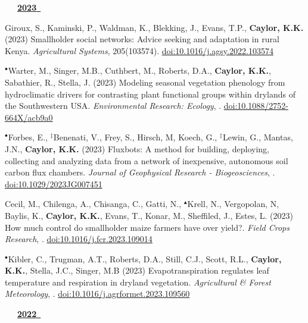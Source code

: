 
                                                                                            

\mbox{\ \ \ \underline{\textbf{2023 }}}

\begin{etaremune}

\item Giroux, S., Kaminski, P., Waldman, K., Blekking, J., Evans, T.P., \textbf{ Caylor, K.K.} (2023) Smallholder social networks: Advice seeking and adaptation in rural Kenya. \emph{Agricultural Systems}, 205(103574). \href{https://doi.org/10.1016/j.agsy.2022.103574}{doi:10.1016/j.agsy.2022.103574}
\item $^{\bullet}$Warter, M., Singer, M.B., Cuthbert, M., Roberts, D.A., \textbf{ Caylor, K.K.}, Sabathier, R., Stella, J. (2023) Modeling seasonal vegetation phenology from hydroclimatic drivers for contrasting plant functional groups within drylands of the Southwestern USA. \emph{Environmental Research: Ecology}, . \href{https://doi.org/10.1088/2752-664X/acb9a0}{doi:10.1088/2752-664X/acb9a0}
\item $^{\bullet}$Forbes, E., $^{\ddagger}$Benenati, V., Frey, S., Hirsch, M, Koech, G., $^{\ddagger}$Lewin, G., Mantas, J.N., \textbf{ Caylor, K.K.} (2023) Fluxbots: A method for building, deploying, collecting and analyzing data from a network of inexpensive, autonomous soil carbon flux chambers. \emph{Journal of Geophysical Research - Biogeosciences}, . \href{https://doi.org/10.1029/2023JG007451}{doi:10.1029/2023JG007451}
\item Cecil, M., Chilenga, A., Chisanga, C., Gatti, N., $^{\blacktriangle}$Krell, N., Vergopolan, N, Baylis, K., \textbf{ Caylor, K.K.}, Evans, T., Konar, M., Sheffiled, J., Estes, L. (2023) How much control do smallholder maize farmers have over yield?. \emph{Field Crops Research}, . \href{https://doi.org/10.1016/j.fcr.2023.109014}{doi:10.1016/j.fcr.2023.109014}
\item $^{\bullet}$Kibler, C., Trugman, A.T., Roberts, D.A., Still, C.J., Scott, R.L., \textbf{ Caylor, K.K.}, Stella, J.C., Singer, M.B (2023) Evapotranspiration regulates leaf temperature and respiration in dryland vegetation. \emph{Agricultural \& Forest Meteorology}, . \href{https://doi.org/10.1016/j.agrformet.2023.109560}{doi:10.1016/j.agrformet.2023.109560}


\vspace{0.1in}
\mbox{\ \ \ \underline{\textbf{2022 }}}
\vspace{0.1in}


\end{etaremune}
